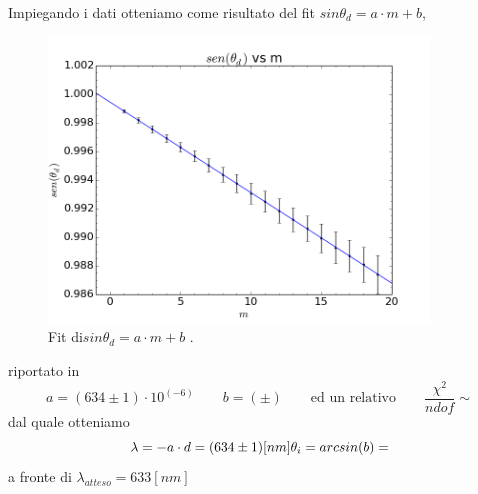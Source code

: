 Impiegando i dati  
otteniamo come risultato del fit $sin \theta_d = a \cdot m + b$,
\begin{figure} [!h]
	\centering
	\includegraphics[width=0.9\textwidth]{./pictures/fitprova}
	\caption{Fit di$sin \theta_d = a \cdot m + b$ .}
	\label{fig:fit}
\end{figure}
riportato in  
\smallskip
$$a=(634	\pm	1	)\cdot 10^(-6)	\qquad	b=(		\pm		)	\qquad \text{ed un relativo}\qquad \frac{\chi^2}{ndof}\sim $$
\smallskip
dal quale otteniamo \smallskip\begin{equation}
\lambda=-a \cdot d = (634	 \pm 1	)[nm] \\
\theta_i=arcsin(b)=
\end{equation}
a fronte di $ \lambda_{atteso}=633 [nm]$